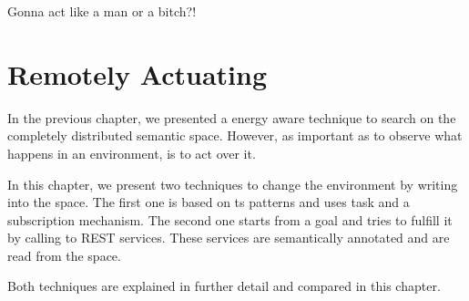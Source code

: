 

\begin{savequote}[50mm]
Gonna act like a man or a bitch?!
\end{savequote}


\chapter{Remotely Actuating}
\label{cha:actuate}
\newcommand{\pathchapfive}{5_actuate}


\ifpdf
    \graphicspath{{\pathchapfive/figures/PNG/}{\pathchapfive/figures/PDF/}{\pathchapfive/figures/}}
\else
    \graphicspath{{\pathchapfive/figures/EPS/}{\pathchapfive/figures/}}
\fi



In the previous chapter, we presented a energy aware technique to search on the completely distributed semantic space.
However, as important as to observe what happens in an environment, is to act over it.

In this chapter, we present two techniques to change the environment by writing into the space.
The first one is based on \ac{ts} patterns and uses task and a subscription mechanism.
The second one starts from a goal and tries to fulfill it by calling to REST services.
These services are semantically annotated and are read from the space.

Both techniques are explained in further detail and compared in this chapter.






